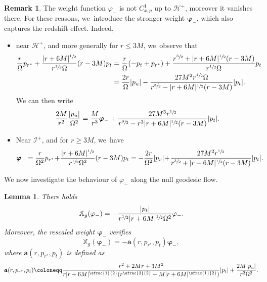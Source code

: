 \documentclass[JEP,XML,SOM,Unicode,published]{cedram}
\theoremstyle{plain}
\newtheorem{lemma}[proposition]{Lemma}
\theoremstyle{definition}
\newtheorem{remark}[proposition]{Remark}
\newcommand\T{{\mathbb{X}}}
\renewcommand\H{{\mathcal{H}^+}}
\begin{document}
\begin{remark}\label{RkvarphiHplus}
The weight function $\varphi_-$ is not $C^1_{x,p}$ up to $\H$, moreover it vanishes there. For these reasons, we~introduce the stronger weight $\pmb{\varphi}_-$, which also captures the redshift effect. Indeed,
\begin{itemize}
\item near $\mathcal{H}^+$, and more generally for $r \leq 3M$, we~observe that
\begin{align*}
\frac{r}{\Omega}p_{r^*}+\frac{|r+6M|^{\sfrac{1}{2}}}{r^{\sfrac{1}{2}}\Omega}(r-3M)p_t & =\frac{r}{\Omega}(-p_t+p_{r^*})+\frac{r^{\sfrac{3}{2}}+|r+6M|^{\sfrac{1}{2}}(r-3M)}{r^{\sfrac{1}{2}} \Omega}p_t \\
& = \frac{2r}{\Omega}|p_u|- \frac{27M^2r^{\sfrac{1}{2}}\Omega}{r^{\sfrac{3}{2}}-|r+6M|^{\sfrac{1}{2}}(r-3M)} |p_t|.
\end{align*}
We can then write
\[
\frac{2M}{r^2}\frac{|p_u|}{\Omega^2}= \frac{M}{r^3}\pmb{\varphi}_- + \frac{27M^3r^{\sfrac{1}{2}}}{r^{\sfrac{9}{2}}-r^3|r+6M|^{\sfrac{1}{2}}(r-3M)} |p_t|.
\]
\item Near $\mathcal{I}^+$, and for $r \geq 3M$, we~have
\begin{align*}
\pmb{\varphi}_-=\frac{r}{\Omega^2}p_{r^*}\!+\!\frac{|r+6M|^{\sfrac{1}{2}}}{r^{\sfrac{1}{2}}\Omega^2}(r-3M)p_t & = -\frac{2r}{\Omega^2}|p_v|\!+\! \frac{27M^2r^{\sfrac{1}{2}}}{r^{\sfrac{3}{2}}+|r+6M|^{\sfrac{1}{2}}(r-3M)} |p_t|.
\end{align*}
\end{itemize}
\end{remark}

We now investigate the behaviour of $\varphi_-$ along the null geodesic flow.

\begin{lemma}\label{Lemphiminus}
There holds
\[
\T_g(\varphi_-)= - \frac{ |p_t|}{r^{\sfrac{1}{2}}|r+6M|^{\sfrac{1}{2}} \Omega^2}\varphi_{-}.
\]
Moreover, the rescaled weight $\pmb{\varphi}_-$ verifies
\[
\T_g(\pmb{\varphi}_-) = - \pmb{a}(r,p_{r^*},p_t) \pmb{\varphi}_-,
\]
where $\pmb{a}(r,p_{r^*},p_t)$ is defined as
\[
\pmb{a}(r,p_{r^*},p_t)\coloneqq\frac{r^2+2Mr+3M^2}{r|r+6M|^{\sfrac{1}{2}}(r^{\sfrac{3}{2}}+M|r+6M|^{\sfrac{1}{2}}) }|p_t| +\frac{2M|p_u|}{r^2\Omega^2}.
\]
\end{lemma}
\end{document}
